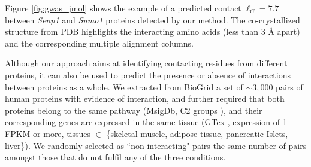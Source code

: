 
Figure \ref{fig:gwas_jmol} shows the example of a predicted contact $\ell_C = 7.7$ between \textit{Senp1} and \textit{Sumo1} proteins detected by our method. The co-crystallized structure from PDB highlights the interacting amino acids (less than $3$ \r{A} apart) and the corresponding multiple alignment columns.

Although our approach aims at identifying contacting residues from different proteins, it can also be used to predict the presence or absence of interactions between proteins as a whole. 
We extracted from BioGrid \cite{stark2006biogrid} a set of $\sim3,000$ pairs of human proteins with evidence of interaction, and further required that both proteins belong to the same pathway (MsigDb, C2 groups \cite{subramanian2005gene}), and their corresponding genes are expressed in the same tissue (GTex \cite{lonsdale2013genotype}, expression of 1 FPKM or more, tissues $\in$ \{skeletal muscle, adipose tissue, pancreatic Islets, liver\}). We randomly selected as ``non-interacting" pairs the same number of pairs amongst those that do not fulfil any of the three conditions.

